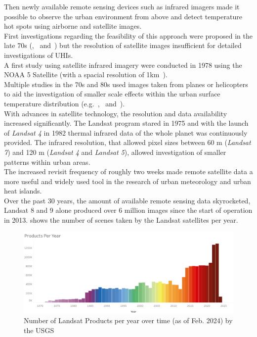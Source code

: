 \documentclass[12pt,a4paper, english,twoside]{article}
\begin{document}
  Then newly available remote sensing devices such as infrared imagers made it possible to observe the urban environment from above and detect temperature hot spots using airborne and satellite images.  \\
  First investigations regarding the feasibility of this approach were proposed in the late 70s (\cite{Watson1975},~\cite{Carlson1977} and~\cite{Block1978}) but the resolution of satellite images insufficient for detailed investigations of \glspl{UHI}.\\
  A first study using satellite infrared imagery were conducted in 1978 using the NOAA 5 Satellite (with a spacial resolution of 1km~\autocite{Matson1978}).\\
  Multiple studies in the 70s and 80s used images taken from planes or helicopters to aid the investigation of smaller scale effects within the urban surface temperature distribution (e.g.~\cite{Landsberg1979},~\cite{ljungberg1980use} and~\cite{Foster1981}). \\
  With advances in satellite technology, the resolution and data availability increased significantly. 
  The Landsat program stared in 1975 and with the launch of \textit{Landsat 4} in 1982 thermal infrared data of the whole planet was continuously provided. 
  The infrared resolution, that allowed pixel sizes between 60 m (\textit{Landsat 7}) and 120 m (\textit{Landsat 4} and \textit{Landsat 5}), allowed investigation of smaller patterns within urban areas.\\
  The increased revisit frequency of roughly two weeks made remote satellite data a more useful and widely used tool in the research of urban meteorology and urban heat islands. \\
  Over the past 30 years, the amount of available remote sensing data skyrocketed, Landsat 8 and 9 alone produced over 6 million images since the start of operation in 2013.  shows the number of scenes taken by the Landsat satellites per year.
  \begin{figure}[!htbp]
    \centering
    \includegraphics[width=\textwidth]{img/LandsatDataArchiveStatsProductsPerYear.png}
  \caption{Number of Landsat Products per year over time (as of Feb. 2024) by the USGS~\autocite{landsatstats}\label{fig:landsatproductsovertime}}
  \end{figure}
\end{document}

